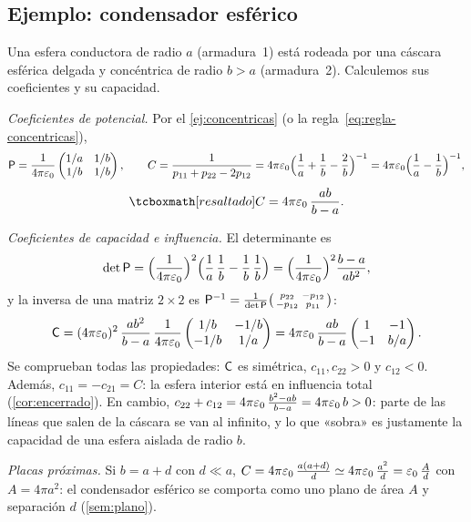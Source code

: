 \subsection{Ejemplo: condensador esférico}\label{sec:ej-esferico}
\begin{ejemplo}\label{ej:esferico}
Una esfera conductora de radio $a$ (armadura~1) está rodeada por una cáscara esférica delgada y concéntrica de radio $b>a$ (armadura~2). Calculemos sus
coeficientes y su capacidad.

\emph{Coeficientes de potencial.} Por el \cref{ej:concentricas} (o la regla~\eqref{eq:regla-concentricas}),
\[
  \mathsf{P}=\frac{1}{4\pi\varepsilon_{0}}\begin{pmatrix}1/a & 1/b\\ 1/b & 1/b\end{pmatrix},\qquad
  C=\frac{1}{p_{11}+p_{22}-2p_{12}}=4\pi\varepsilon_{0}\Bigl(\frac1a+\frac1b-\frac2b\Bigr)^{-1}=4\pi\varepsilon_{0}\Bigl(\frac1a-\frac1b\Bigr)^{-1},
\]
\begin{equation}\label{eq:cap-esferico}
  \resalta{C=4\pi\eo\,\frac{ab}{b-a} .}
\end{equation}

\emph{Coeficientes de capacidad e influencia.} El determinante es
\[
  \det\mathsf{P}=\Bigl(\frac{1}{4\pi\varepsilon_{0}}\Bigr)^{2}\Bigl(\frac1a\,\frac1b-\frac1b\,\frac1b\Bigr)=\Bigl(\frac{1}{4\pi\varepsilon_{0}}\Bigr)^{2}\frac{b-a}{ab^{2}} ,
\]
y la inversa de una matriz $2\times2$ es $\mathsf{P}^{-1}=\frac{1}{\det\mathsf{P}}\bigl(\begin{smallmatrix}p_{22}&-p_{12}\\-p_{12}&p_{11}\end{smallmatrix}\bigr)$:
\[
  \mathsf{C}=(4\pi\varepsilon_{0})^{2}\,\frac{ab^{2}}{b-a}\,\frac{1}{4\pi\varepsilon_{0}}\begin{pmatrix}1/b & -1/b\\ -1/b & 1/a\end{pmatrix}
  =4\pi\varepsilon_{0}\,\frac{ab}{b-a}\begin{pmatrix}1 & -1\\ -1 & b/a\end{pmatrix}.
\]
Se comprueban todas las propiedades: $\mathsf{C}$ es simétrica, $c_{11},c_{22}>0$ y $c_{12}<0$. Además, $c_{11}=-c_{21}=C$: la esfera interior está en influencia
total (\cref{cor:encerrado}). En cambio, $c_{22}+c_{12}=4\pi\varepsilon_{0}\,\frac{b^{2}-ab}{b-a}=4\pi\varepsilon_{0}\,b>0$: parte de las líneas que salen de la cáscara se van al
infinito, y lo que «sobra» es justamente la capacidad de una esfera aislada de radio $b$.

\emph{Placas próximas.} Si $b=a+d$ con $d\ll a$,
$C=4\pi\varepsilon_{0}\,\frac{a(a+d)}{d}\simeq4\pi\varepsilon_{0}\,\frac{a^{2}}{d}=\varepsilon_{0}\,\frac{A}{d}$ con $A=4\pi a^{2}$: el condensador esférico se comporta como uno plano de
área $A$ y separación $d$ (\cref{sem:plano}).
\end{ejemplo}

